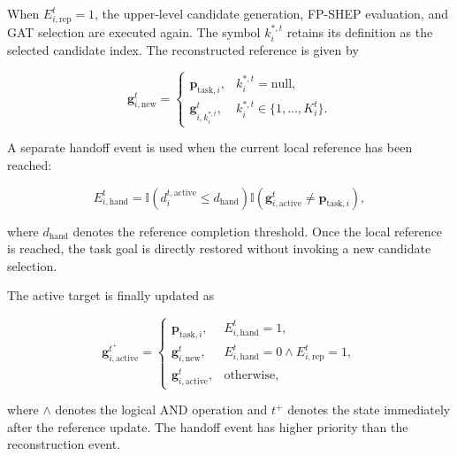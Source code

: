 When $E_{i,\mathrm{rep}}^t=1$, the upper-level candidate generation, FP-SHEP evaluation, and GAT selection are executed again.
The symbol $k_i^{*,t}$ retains its definition as the selected candidate index.
The reconstructed reference is given by

\begin{equation}
    \label{eq:selected_reference_mapping}
    \mathbf g_{i,\mathrm{new}}^t
    =
    \begin{cases}
        \mathbf p_{\mathrm{task},i},
        & k_i^{*,t}=\mathrm{null},\\[1mm]
        \mathbf g_{i,k_i^{*,t}}^t,
        & k_i^{*,t}\in\{1,\ldots,K_i^t\}.
    \end{cases}
\end{equation}

A separate handoff event is used when the current local reference has been reached:

\begin{equation}
    \label{eq:reference_handoff_event}
    E_{i,\mathrm{hand}}^t
    =
    \mathbb I
    \left(
    d_i^{t,\mathrm{active}}
    \leq d_{\mathrm{hand}}
    \right)
    \mathbb I
    \left(
    \mathbf g_{i,\mathrm{active}}^t
    \neq
    \mathbf p_{\mathrm{task},i}
    \right),
\end{equation}

\noindent
where $d_{\mathrm{hand}}$ denotes the reference completion threshold.
Once the local reference is reached, the task goal is directly restored without invoking a new candidate selection.

The active target is finally updated as

\begin{equation}
    \label{eq:unified_reference_update}
    \mathbf g_{i,\mathrm{active}}^{t^{+}}
    =
    \begin{cases}
        \mathbf p_{\mathrm{task},i},
        & E_{i,\mathrm{hand}}^t=1,\\[1mm]
        \mathbf g_{i,\mathrm{new}}^t,
        & E_{i,\mathrm{hand}}^t=0
        \land
        E_{i,\mathrm{rep}}^t=1,\\[1mm]
        \mathbf g_{i,\mathrm{active}}^t,
        & \mathrm{otherwise},
    \end{cases}
\end{equation}

\noindent
where $\land$ denotes the logical AND operation and $t^{+}$ denotes the state immediately after the reference update.
The handoff event has higher priority than the reconstruction event.

